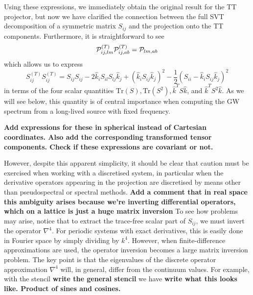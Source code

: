 \documentclass{revtex4}
\begin{document}
Using these expressions, we immediately obtain the original result for the TT projector,
but now we have clarified the connection between the full SVT decomposition of a symmetric matrix $S_{ij}$ and the projection onto the TT components.
Furthermore, it is straightforward to see
\begin{equation}
  \mathcal{P}_{ij,lm}^{(T)}\mathcal{P}_{ij,ab}^{(T)} = \mathcal{P}_{lm,ab}
\end{equation}
which allows us to express
\begin{equation}
  S_{ij}^{(T)}S_{ij}^{(T)} = S_{ij}S_{ij} - 2\hat{k}_iS_{il}S_{lj}\hat{k}_j + \left(\hat{k}_iS_{ij}\hat{k}_j\right)^2 - \frac{1}{2}\left(S_{ii}-\hat{k}_iS_{ij}\hat{k}_j\right)^2
\end{equation}
in terms of the four scalar quantities $\mathrm{Tr}(S), \mathrm{Tr}(S^2), \hat{k}^TS\hat{k}$, and $\hat{k}^TS^2\hat{k}$.
As we will see below, this quantity is of central importance when computing the GW spectrum from a long-lived source with fixed frequency.

{\bf Add expressions for these in spherical instead of Cartesian coordinates.  Also add the corresponding transformed tensor components.  Check if these expressions are covariant or not.}

However, despite this apparent simplicity, it should be clear that caution must be exercised when working with a discretised system, in particular when the derivative operators appearing in the projection are discretised by means other than pseudospectral or spectral methods.
{\bf Add a comment that in real space this ambiguity arises because we're inverting differential operators, which on a lattice is just a huge matrix inversion}
To see how problems may arise, notice that to extract the trace-free scalar part of $S_{ij}$, we must invert the operator $\nabla^4$.
For periodic systems with exact derivatives, this is easily done in Fourier space by simply dividing by $k^4$.
However, when finite-difference approximations are used, the operator inversion becomes a large matrix inversion problem.
The key point is that the eigenvalues of the discrete operator approximation $\nabla^4$ will, in general, differ from the continuum values.
For example, with the stencil
{\bf write the general stencil}
we have
{\bf write what this looks like.  Product of sines and cosines.}
\end{document}
